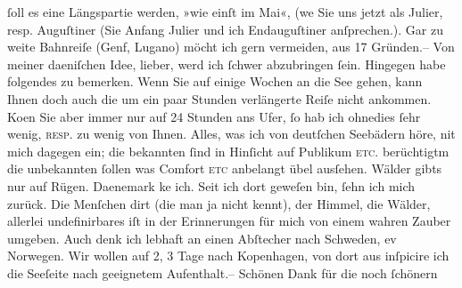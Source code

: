 \begin{ledgroupsized}[t]{13cm}
               ſoll es eine Längspartie werden, »wie einſt im Mai«, (we{\geminationn} Sie uns jetzt als Julier, resp. Auguſtiner (Sie \introOben{}Anfang\introOben{}
               Julier und ich Endauguſtiner anſprechen.). Gar zu weite Bahnreiſe (Genf, Lugano) möcht ich
               gern vermeiden, {\pb}aus 17 Gründen.– Von meiner
                  daeniſchen Idee, lieber, werd ich ſchwer
               abzubringen ſein. Hingegen habe folgendes zu bemerken. Wenn Sie auf einige Wochen an
               die See gehen, kann Ihnen doch auch die um ein paar Stunden verlängerte Reiſe nicht
               ankommen. Ko{\geminationm}en Sie aber immer nur auf 24 Stunden ans
               Ufer, ſo hab ich ohnedies ſehr wenig, \textsc{resp.} zu wenig von
               Ihnen. Alles, was ich von deutſchen Seebädern höre, ni{\geminationm}t
               mich dagegen ein; die bekannten {\pb}ſind in
               Hinſicht auf Publikum \textsc{etc.} berüchtigtm die unbekannten
               ſollen was Comfor\strikeout{\textcolor{gray}{×}}t \textsc{etc} anbelangt übel ausſehen. Wälder gibts nur auf
                  Rügen. Daenemark ke{\geminationn} ich. Seit ich dort geweſen bin,
               ſehn ich mich zurück. Die Menſchen dirt (die man ja nicht kennt), der Himmel, die
               Wälder, allerlei undefinirbares iſt in der Erinnerungen für mich von einem wahren
               Zauber umgeben. Auch denk ich lebhaft an einen Abſtecher nach Schweden, ev Norwegen. Wir wollen auf 2, 3 {\pb}Tage nach Kopenhagen, von dort aus inſpicire ich die Seeſeite nach geeignetem Aufenthalt.– \pend
           \pstart
           Schönen Dank für die noch ſchönern \label{K_L03003-111v}
\end{ledgroupsized}
